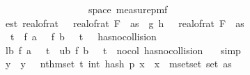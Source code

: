 \begin{isabellebody}
\ \ \ \ \ \ \isamarkupfalse%
\ {\isasymomega}\isanewline
\ \ \ \ \ \ \isamarkupfalse%
\ {\isachardoublequoteopen}{\isasymomega}\ {\isasymin}\ space\ {\isacharparenleft}{\kern0pt}measure{\isacharunderscore}{\kern0pt}pmf\ {\isasymOmega}\isanewline
\ \ \ \ \ \ \isamarkupfalse%
\ est{\isacharcolon}{\kern0pt}\ {\isachardoublequoteopen}real{\isacharunderscore}{\kern0pt}of{\isacharunderscore}{\kern0pt}rat\ {\isasymdelta}\ {\isacharasterisk}{\kern0pt}\ real{\isacharunderscore}{\kern0pt}of{\isacharunderscore}{\kern0pt}rat\ {\isacharparenleft}{\kern0pt}F\ {}\ as{\isacharparenright}{\kern0pt}\ {\isacharless}{\kern0pt}\ {\isasymbar}g{\isacharprime}{\kern0pt}\ {\isacharparenleft}{\kern0pt}h\ {\isasymomega}{\isacharparenright}{\kern0pt}\ {\isacharminus}{\kern0pt}\ real{\isacharunderscore}{\kern0pt}of{\isacharunderscore}{\kern0pt}rat\ {\isacharparenleft}{\kern0pt}F\ {}\ as{\isacharparenright}{\kern0pt}{\isasymbar}{\isachardoublequoteclose}\isanewline
\ \ \ \ \ \ \isamarkupfalse%
\ {\isachardoublequoteopen}{\isasymnot}{\isacharparenleft}{\kern0pt}\ t\ {\isasymle}\ f\ a\ {\isasymomega}\ {\isasymor}\ f\ b\ {\isasymomega}\ {\isacharless}{\kern0pt}\ t\ {\isasymor}\ {\isasymnot}\ has{\isacharunderscore}{\kern0pt}no{\isacharunderscore}{\kern0pt}collision\ {\isasymomega}{\isacharparenright}{\kern0pt}{\isachardoublequoteclose}\isanewline
\ \ \ \ \ \ \isamarkupfalse%
\ lb{\isacharcolon}{\kern0pt}\ {\isachardoublequoteopen}f\ a\ {\isasymomega}\ {\isacharless}{\kern0pt}\ t{\isachardoublequoteclose}\ \ ub{\isacharcolon}{\kern0pt}\ {\isachardoublequoteopen}f\ b\ {\isasymomega}\ {\isasymge}\ t{\isachardoublequoteclose}\ \ no{\isacharunderscore}{\kern0pt}col{\isacharcolon}{\kern0pt}\ {\isachardoublequoteopen}has{\isacharunderscore}{\kern0pt}no{\isacharunderscore}{\kern0pt}collision\ {\isasymomega}{\isachardoublequoteclose}\ \isamarkupfalse%
\ simp{\isacharplus}{\kern0pt}\isanewline
\isanewline
\ \ \ \ \ \ \isamarkupfalse%
\ y\ \ {\isachardoublequoteopen}y\ {\isacharequal}{\kern0pt}\ \ nth{\isacharunderscore}{\kern0pt}mset\ {\isacharparenleft}{\kern0pt}t{\isacharminus}{\kern0pt}{}{\isacharparenright}{\kern0pt}\ {\isacharbraceleft}{\kern0pt}{\isacharhash}{\kern0pt}int\ {\isacharparenleft}{\kern0pt}hash\ p\ x\ {\isasymomega}{\isacharparenright}{\kern0pt}{\isachardot}{\kern0pt}\ x\ {\isasymin}{\isacharhash}{\kern0pt}\ mset{\isacharunderscore}{\kern0pt}set\ {\isacharparenleft}{\kern0pt}set\ as{\isacharparenright}{\kern0pt}{\isacharhash}{\kern0pt}{\isacharbraceright}{\kern0pt}{\isachardoublequoteclose}\isanewline

\end{isabellebody}
